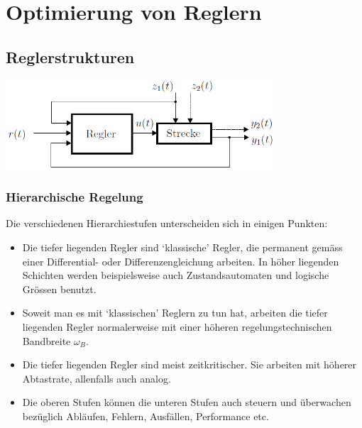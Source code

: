 \section{Optimierung von Reglern}
\subsection{Reglerstrukturen}
\includegraphics[width=10cm]{./images/Reglerstruktur.png}
\subsubsection{Hierarchische Regelung}
Die verschiedenen Hierarchiestufen unterscheiden sich in einigen Punkten:
\begin{itemize}
	\item Die tiefer liegenden Regler sind ‘klassische’ Regler, die permanent gemäss einer
	Differential- oder Differenzengleichung arbeiten. In höher liegenden Schichten
	werden beispielsweise auch Zustandsautomaten und logische Grössen benutzt.
	\item Soweit man es mit ‘klassischen’ Reglern zu tun hat, arbeiten die tiefer liegenden
	Regler normalerweise mit einer höheren regelungstechnischen Bandbreite $\omega_B$.
	\item Die tiefer liegenden Regler sind meist zeitkritischer. Sie arbeiten mit höherer
	Abtastrate, allenfalls auch analog.
	\item Die oberen Stufen können die unteren Stufen auch steuern und überwachen
	bezüglich Abläufen, Fehlern, Ausfällen, Performance etc.
\end{itemize}

